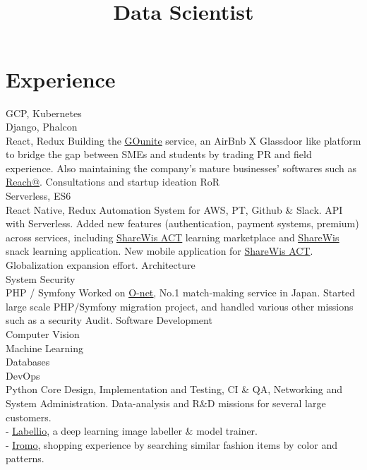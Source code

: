 \documentclass[a4paper,11pt]{cv4tw}%
\title{\\ Data Scientist}
\begin{document}
\section{Experience}
{GCP, Kubernetes\\Django, Phalcon\\React, Redux}
{Building the \underline{\href{https://www.gounite.com/}{GOunite}} service, an
AirBnb X Glassdoor like platform to bridge the gap between SMEs and students
by trading PR and field experience.
Also maintaining the company's mature businesses' softwares such as
\underline{\href{http://www.reachat.jp/}{Reach@}}.
}
{}
{Consultations and startup ideation}
{RoR\\Serverless, ES6\\React Native, Redux}
{Automation System for AWS, PT, Github \& Slack. API with Serverless. Added
new features (authentication, payment systems, premium) across services,
including \underline{\href{https://act.share-wis.com}{ShareWis ACT}} learning
marketplace and \underline{\href{https://www.share-wis.com}{ShareWis}} snack
learning application.
New mobile application for \href{https://act.share-wis.com}{ShareWis ACT}.
Globalization expansion effort.
}
{Architecture\\System Security\\PHP / Symfony}
{Worked on \underline{\href{http://onet.rakuten.co.jp/}{O-net}}, No.1
  match-making service in Japan. Started large scale PHP/Symfony migration
  project, and handled various other missions such as a security Audit.
}
{Software Development\\Computer Vision\\Machine Learning\\Databases\\DevOps\\Python}
{Core Design, Implementation and Testing, CI \& QA, Networking and System Administration.
Data-analysis and R\&D missions for several large customers.\\
- \underline{\href{http://www.labell.io/}{Labellio}}, a deep
    learning image labeller \& model trainer.\\
- \underline{\href{http://iromo.jp}{Iromo}}, shopping experience by
    searching similar fashion items by color and patterns.
}
\end{document}
